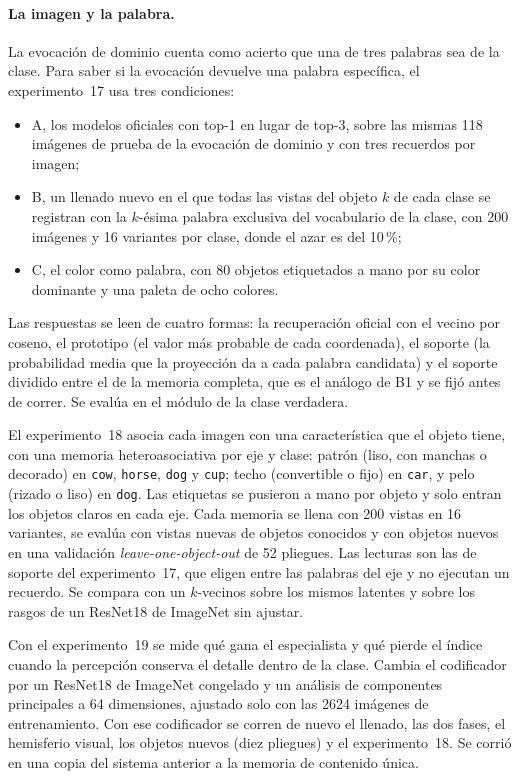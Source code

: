 \paragraph{La imagen y la palabra.}
La evocación de dominio cuenta como acierto que una de tres palabras sea de la clase.
Para saber si la evocación devuelve una palabra específica, el experimento~17 usa tres
condiciones:
\begin{itemize}
    \item A, los modelos oficiales con top-1 en lugar de top-3, sobre las mismas 118
    imágenes de prueba de la evocación de dominio y con tres recuerdos por imagen;
    \item B, un llenado nuevo en el que todas las vistas del objeto $k$ de cada clase se
    registran con la $k$-ésima palabra exclusiva del vocabulario de la clase, con 200
    imágenes y 16 variantes por clase, donde el azar es del 10\,\%;
    \item C, el color como palabra, con 80 objetos etiquetados a mano por su color
    dominante y una paleta de ocho colores.
\end{itemize}
Las respuestas se leen de cuatro formas: la recuperación oficial con el vecino por
coseno, el prototipo (el valor más probable de cada coordenada), el soporte (la
probabilidad media que la proyección da a cada palabra candidata) y el soporte dividido
entre el de la memoria completa, que es el análogo de B1 y se fijó antes de correr.
Se evalúa en el módulo de la clase verdadera.

El experimento~18 asocia cada imagen con una característica que el objeto tiene, con
una memoria heteroasociativa por eje y clase: patrón (liso, con manchas o decorado) en
\texttt{cow}, \texttt{horse}, \texttt{dog} y \texttt{cup}; techo (convertible o fijo)
en \texttt{car}, y pelo (rizado o liso) en \texttt{dog}.
Las etiquetas se pusieron a mano por objeto y solo entran los objetos claros en cada
eje.
Cada memoria se llena con 200 vistas en 16 variantes, se evalúa con vistas nuevas de
objetos conocidos y con objetos nuevos en una validación \textit{leave-one-object-out}
de 52 pliegues.
Las lecturas son las de soporte del experimento~17, que eligen entre las palabras del
eje y no ejecutan un recuerdo.
Se compara con un $k$-vecinos sobre los mismos latentes y sobre los rasgos de un ResNet18
de ImageNet sin ajustar.

Con el experimento~19 se mide qué gana el especialista y qué pierde el índice cuando la
percepción conserva el detalle dentro de la clase.
Cambia el codificador por un ResNet18 de ImageNet congelado y un análisis de componentes
principales a 64 dimensiones, ajustado solo con las 2624 imágenes de entrenamiento.
Con ese codificador se corren de nuevo el llenado, las dos fases, el hemisferio visual,
los objetos nuevos (diez pliegues) y el experimento~18.
Se corrió en una copia del sistema anterior a la memoria de contenido única.

